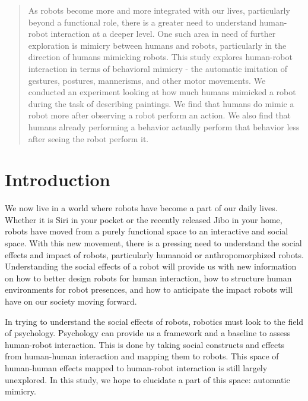 \documentclass{acm_proc_article-sp}
\begin{document}
\maketitle
\begin{abstract}
As robots become more and more integrated with our lives, particularly beyond a functional role, there is a greater need to understand human-robot interaction at a deeper level. One such area in need of further exploration is mimicry between humans and robots, particularly in the direction of humans mimicking robots. This study explores human-robot interaction in terms of behavioral mimicry - the automatic imitation of gestures, postures, mannerisms, and other motor movements. We conducted an experiment looking at how much humans mimicked a robot during the task of describing paintings. We find that humans do mimic a robot more after observing a robot perform an action. We also find that humans already performing a behavior actually perform that behavior less after seeing the robot perform it.
\end{abstract}


\section{Introduction}
We now live in a world where robots have become a part of our daily lives. Whether it is Siri in your pocket or the recently released Jibo in your home, robots have moved from a purely functional space to an interactive and social space. With this new movement, there is a pressing need to understand the social effects and impact of robots, particularly humanoid or anthropomorphized robots. Understanding the social effects of a robot will provide us with new information on how to better design robots for human interaction, how to structure human environments for robot presences, and how to anticipate the impact robots will have on our society moving forward. 

In trying to understand the social effects of robots, robotics must look to the field of psychology. Psychology can provide us a framework and a baseline to assess human-robot interaction. This is done by taking social constructs and effects from human-human interaction and mapping them to robots. This space of human-human effects mapped to human-robot interaction is still largely unexplored. In this study, we hope to elucidate a part of this space: automatic mimicry.
\end{document}
